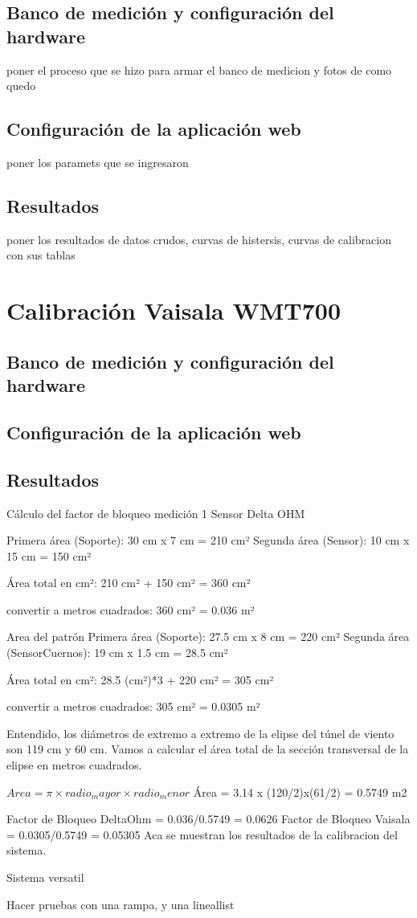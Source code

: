 \subsection{Banco de medición y configuración del hardware}
poner el proceso que se hizo para armar el banco de medicion y fotos de como quedo
 
\subsection{Configuración de la aplicación web}

poner los paramets que se ingresaron
\subsection{Resultados}

poner los resultados de datos crudos, curvas de histersis, curvas de calibracion 
con sus tablas

\section{Calibración Vaisala WMT700}
\subsection{Banco de medición y configuración del hardware}
\subsection{Configuración de la aplicación web}
\subsection{Resultados}


Cálculo del factor de bloqueo medición 1
Sensor Delta OHM

Primera área (Soporte): 30 cm x 7 cm = 210 cm²
Segunda área (Sensor): 10 cm x 15 cm = 150 cm²

Área total en cm²: 210 cm² + 150 cm² = 360 cm²

convertir a metros cuadrados:
360 cm² = 0.036 m²


Area del patrón
Primera área (Soporte): 27.5 cm x 8 cm = 220 cm²
Segunda área (SensorCuernos): 19 cm x 1.5 cm = 28.5 cm²

Área total en cm²: 28.5 (cm²)*3 + 220 cm² =  305 cm²

convertir a metros cuadrados:
305 cm² = 0.0305 m²


Entendido, los diámetros de extremo a extremo de la elipse del túnel de viento son 119 cm y 60 cm. Vamos a calcular el área total de la sección transversal de la elipse en metros cuadrados.

$Area=\pi × radio_mayor × radio_ menor$
Área = 3.14 x (120/2)x(61/2) = 0.5749 m2

Factor de Bloqueo DeltaOhm = 0.036/0.5749 = 0.0626
Factor de Bloqueo Vaisala = 0.0305/0.5749 = 0.05305
Aca se muestran los resultados de la calibracion del sistema.

Sistema versatil

Hacer pruebas con una rampa, y una lineallist